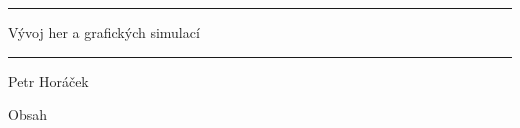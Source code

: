 \nopagenumbers


\hrule width 6in
\tit Vývoj her a grafických simulací
\hrule width 6in

\vskip 5mm
\hfil Petr Horáček\hfil

\newpage

\nonum\notoc\sec Obsah
\maketoc
\newpage

\pagenumbers
